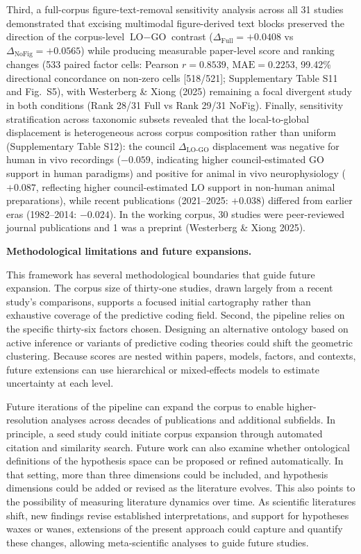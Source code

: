 \documentclass[12pt]{article}
\begin{document}
Third, a full-corpus figure-text-removal sensitivity analysis across all 31 studies demonstrated that excising multimodal figure-derived text blocks preserved the direction of the corpus-level $\text{LO}-\text{GO}$ contrast ($\Delta_{\text{Full}} = +0.0408$ vs $\Delta_{\text{NoFig}} = +0.0565$) while producing measurable paper-level score and ranking changes (533 paired factor cells: Pearson $r = 0.8539$, $\text{MAE} = 0.2253$, 99.42\% directional concordance on non-zero cells [518/521]; Supplementary Table S11 and Fig.~S5), with Westerberg \& Xiong (2025) remaining a focal divergent study in both conditions (Rank 28/31 Full vs Rank 29/31 NoFig). Finally, sensitivity stratification across taxonomic subsets revealed that the local-to-global displacement is heterogeneous across corpus composition rather than uniform (Supplementary Table S12): the council $\Delta_{\text{LO-GO}}$ displacement was negative for human in vivo recordings ($-0.059$, indicating higher council-estimated GO support in human paradigms) and positive for animal in vivo neurophysiology ($+0.087$, reflecting higher council-estimated LO support in non-human animal preparations), while recent publications (2021--2025: $+0.038$) differed from earlier eras (1982--2014: $-0.024$). In the working corpus, 30 studies were peer-reviewed journal publications and 1 was a preprint (Westerberg \& Xiong 2025).

\noindent\textbf{Methodological limitations and future expansions.}

This framework has several methodological boundaries that guide future expansion. The corpus size of thirty-one studies, drawn largely from a recent study's comparisons\cite{ref34}, supports a focused initial cartography rather than exhaustive coverage of the predictive coding field. Second, the pipeline relies on the specific thirty-six factors chosen. Designing an alternative ontology based on active inference or variants of predictive coding theories could shift the geometric clustering. Because scores are nested within papers, models, factors, and contexts, future extensions can use hierarchical or mixed-effects models to estimate uncertainty at each level.

Future iterations of the pipeline can expand the corpus to enable higher-resolution analyses across decades of publications and additional subfields. In principle, a seed study could initiate corpus expansion through automated citation and similarity search. Future work can also examine whether ontological definitions of the hypothesis space can be proposed or refined automatically. In that setting, more than three dimensions could be included, and hypothesis dimensions could be added or revised as the literature evolves. This also points to the possibility of measuring literature dynamics over time. As scientific literatures shift, new findings revise established interpretations, and support for hypotheses waxes or wanes, extensions of the present approach could capture and quantify these changes, allowing meta-scientific analyses to guide future studies.
\end{document}
